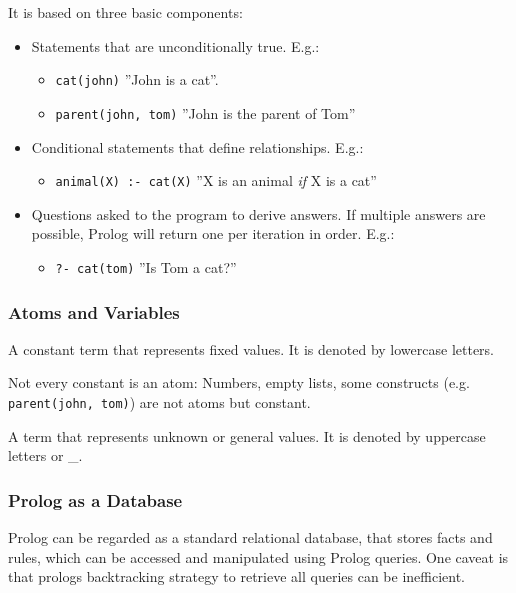 \documentclass[
../../EiKI_Summary.tex,
]
{subfiles}
\begin{document}
It is based on three basic components:
\begin{itemize}
    \item {} Statements that are unconditionally true. E.g.:
    \begin{itemize}
        \item \texttt{cat(john)} ''John is a cat''.
        \item \texttt{parent(john, tom)} ''John is the parent of Tom''
    \end{itemize}
    \item {} Conditional statements that define relationships. E.g.:
    \begin{itemize}
        \item \texttt{animal(X) :- cat(X)} ''X is an animal \textit{if} X is a cat''
    \end{itemize}
    \item {} Questions asked to the program to derive answers. If multiple answers are possible, Prolog will return one per iteration in order. E.g.: 
    \begin{itemize}
        \item \texttt{?- cat(tom)} ''Is Tom a cat?''
    \end{itemize}
\end{itemize}

\subsubsection{Atoms and Variables}
\begin{minipage}
    [t]{0.5\textwidth}
    \begin{defbox}
        [Atom]
        A constant term that represents fixed values. It is denoted by lowercase letters.

        Not every constant is an atom: Numbers, empty lists, some constructs (e.g. \texttt{parent(john, tom)}) are not atoms but constant.
    \end{defbox}
\end{minipage}
\begin{minipage}
    [t]{0.5\textwidth}
    \begin{defbox}
        [Variable]
        A term that represents unknown or general values. It is denoted by uppercase letters or \_. 
    \end{defbox}
\end{minipage}

\subsubsection{Prolog as a Database}
Prolog can be regarded as a standard relational database, that stores facts and rules, which can be accessed and manipulated using Prolog queries. One caveat is that prologs backtracking strategy to retrieve all queries can be inefficient.
\end{document}
